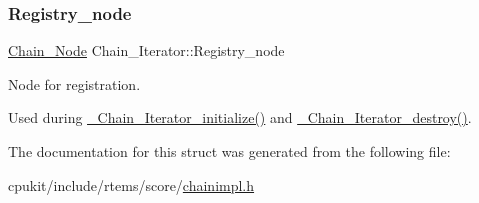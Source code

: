 \subsubsection{\texorpdfstring{Registry\_node}{Registry\_node}}
{\footnotesize\ttfamily \mbox{\hyperlink{group__RTEMSScoreChain_ga0dd4bfcca1ac7f90de2842e447846d3d}{Chain\+\_\+\+Node}} Chain\+\_\+\+Iterator\+::\+Registry\+\_\+node}



Node for registration. 

Used during \mbox{\hyperlink{group__RTEMSScoreChain_gafab713cc67440572b20e0d853163d626}{\+\_\+\+Chain\+\_\+\+Iterator\+\_\+initialize()}} and \mbox{\hyperlink{group__RTEMSScoreChain_gad8dcd1f3d1f286ce2aa20a12c661f2b7}{\+\_\+\+Chain\+\_\+\+Iterator\+\_\+destroy()}}. 

The documentation for this struct was generated from the following file\+:\begin{DoxyCompactItemize}
\item 
cpukit/include/rtems/score/\mbox{\hyperlink{chainimpl_8h}{chainimpl.\+h}}\end{DoxyCompactItemize}
